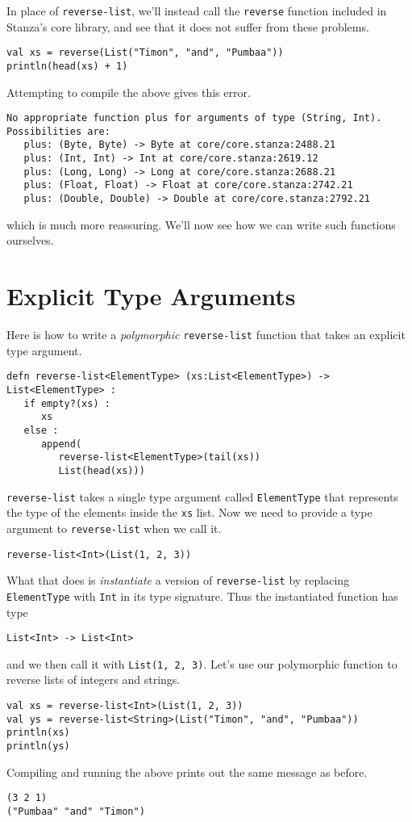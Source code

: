 \documentclass[10pt,oneside]{book}
\begin{document}
In place of \texttt{\frenchspacing reverse-list}, we'll instead call the \texttt{\frenchspacing reverse} function included in Stanza's core library, and see that it does not suffer from these problems.
\begin{lstlisting}
val xs = reverse(List("Timon", "and", "Pumbaa"))
println(head(xs) + 1)
\end{lstlisting} 
Attempting to compile the above gives this error.
\begin{lstlisting}
No appropriate function plus for arguments of type (String, Int). 
Possibilities are:
   plus: (Byte, Byte) -> Byte at core/core.stanza:2488.21
   plus: (Int, Int) -> Int at core/core.stanza:2619.12
   plus: (Long, Long) -> Long at core/core.stanza:2688.21
   plus: (Float, Float) -> Float at core/core.stanza:2742.21
   plus: (Double, Double) -> Double at core/core.stanza:2792.21
\end{lstlisting}
which is much more reassuring. We'll now see how we can write such functions ourselves. 

\section{Explicit Type Arguments}
Here is how to write a {\em polymorphic} \texttt{\frenchspacing reverse-list} function that takes an explicit type argument.
\begin{lstlisting}
defn reverse-list<ElementType> (xs:List<ElementType>) -> List<ElementType> :
   if empty?(xs) :
      xs
   else :
      append(
         reverse-list<ElementType>(tail(xs))
         List(head(xs)))
\end{lstlisting}
\texttt{\frenchspacing reverse-list} takes a single type argument called \texttt{\frenchspacing ElementType} that represents the type of the elements inside the \texttt{\frenchspacing xs} list. Now we need to provide a type argument to \texttt{\frenchspacing reverse-list} when we call it.
\begin{lstlisting}
reverse-list<Int>(List(1, 2, 3))
\end{lstlisting}
What that does is {\em instantiate} a version of \texttt{\frenchspacing reverse-list} by replacing \texttt{\frenchspacing ElementType} with \texttt{\frenchspacing Int} in its type signature. Thus the instantiated function has type
\begin{lstlisting}
List<Int> -> List<Int>
\end{lstlisting}
and we then call it with \texttt{\frenchspacing List(1, 2, 3)}. 
Let's use our polymorphic function to reverse lists of integers and strings.
\begin{lstlisting}
val xs = reverse-list<Int>(List(1, 2, 3))
val ys = reverse-list<String>(List("Timon", "and", "Pumbaa"))
println(xs)
println(ys)
\end{lstlisting}
Compiling and running the above prints out the same message as before.
\begin{lstlisting}
(3 2 1)
("Pumbaa" "and" "Timon")
\end{lstlisting}
\end{document}
